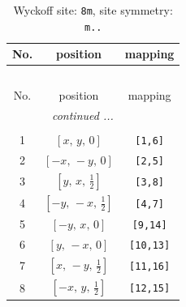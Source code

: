 \documentclass[fleqn,8pt]{jsarticle}
\begin{document}
\begin{longtable}{ccc}
\caption{Wyckoff site: {\tt 8m}, site symmetry: {\tt m..}}
 \\
 \hline \hline
No. & position & mapping \\ \hline \endfirsthead

\multicolumn{2}{l}{\tablename\ \thetable{}} \\
 \hline \hline
No. & position & mapping \\ \hline \endhead

 \hline \hline
\multicolumn{2}{r}{\footnotesize\it continued ...} \\ \endfoot

 \hline \hline
\multicolumn{2}{r}{} \\ \endlastfoot

1 & $\left[ x,\, y,\, 0 \right]$ & {\tt [1,6]} \\ \hline
2 & $\left[ - x,\, - y,\, 0 \right]$ & {\tt [2,5]} \\ \hline
3 & $\left[ y,\, x,\, \frac{1}{2} \right]$ & {\tt [3,8]} \\ \hline
4 & $\left[ - y,\, - x,\, \frac{1}{2} \right]$ & {\tt [4,7]} \\ \hline
5 & $\left[ - y,\, x,\, 0 \right]$ & {\tt [9,14]} \\ \hline
6 & $\left[ y,\, - x,\, 0 \right]$ & {\tt [10,13]} \\ \hline
7 & $\left[ x,\, - y,\, \frac{1}{2} \right]$ & {\tt [11,16]} \\ \hline
8 & $\left[ - x,\, y,\, \frac{1}{2} \right]$ & {\tt [12,15]} \\
\end{longtable}
\renewcommand{\arraystretch}{1.2}
\end{document}
